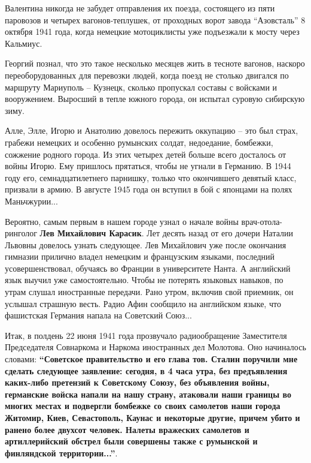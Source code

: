 Валентина никогда не забудет отправления их поезда, состоящего из пяти
паровозов и четырех вагонов-теплушек, от проходных ворот завода \enquote{Азовсталь} 8
октября 1941 года, когда немецкие мотоциклисты уже подъезжали к мосту через
Кальмиус. 

Георгий познал, что это такое несколько месяцев жить в тесноте вагонов, наскоро
переоборудованных для перевозки людей, когда поезд не столько двигался по
маршруту Мариуполь – Кузнецк, сколько пропускал составы с войсками и
вооружением. Выросший в тепле южного города, он испытал суровую сибирскую зиму.

Алле, Элле, Игорю и Анатолию довелось пережить оккупацию – это был страх,
грабежи немецких и особенно румынских солдат, недоедание, бомбежки, сожжение
родного города. Из этих четырех детей больше всего досталось от войны Игорю.
Ему пришлось прятаться, чтобы не угнали в Германию. В 1944 году его,
семнадцатилетнего парнишку, только что окончившего девятый класс, призвали в
армию. В августе 1945 года он вступил в бой с японцами на полях Маньчжурии...

Вероятно, самым первым в нашем городе узнал о начале войны врач-отола\hyp{}ринголог
\textbf{Лев Михайлович Карасик}. Лет десять назад от его дочери Наталии Львовны довелось
узнать следующее. Лев Михайлович уже после окончания гимназии прилично владел
немецким и французским языками, последний усовершенствовал, обучаясь во Франции
в университете Нанта. А английский язык выучил уже самостоятельно. Чтобы не
потерять языковых навыков, по утрам слушал иностранные передачи. Рано утром,
включив свой приемник, он услышал страшную весть. Радио Афин сообщило на
английском языке, что фашистская Германия напала на Советский Союз...

Итак, в полдень 22 июня 1941 года прозвучало радиообращение Заместителя
Председателя Совнаркома и Наркома иностранных дел Молотова. Оно начиналось
словами: \textbf{\enquote{Советское правительство и его глава тов. Сталин поручили мне
сделать следующее заявление: сегодня, в 4 часа утра, без предъявления
каких-либо претензий к Советскому Союзу, без объявления войны, германские
войска напали на нашу страну, атаковали наши границы во многих местах и
подвергли бомбежке со своих самолетов наши города Житомир, Киев, Севастополь,
Каунас и некоторые другие, причем убито и ранено более двухсот человек. Налеты
вражеских самолетов и артиллерийский обстрел были совершены также с румынской и
финляндской территории...}}. 


